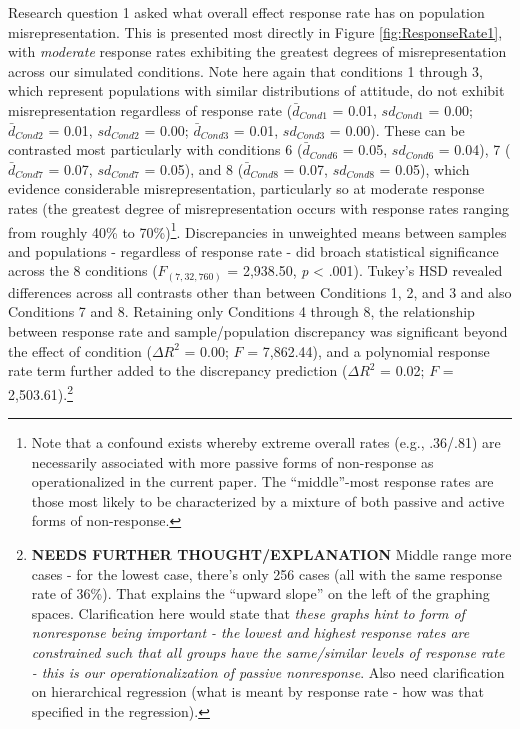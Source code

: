 \documentclass[
  man,mask]{apa7}
\begin{document}
Research question 1 asked what overall effect response rate has on population misrepresentation. This is presented most directly in Figure \ref{fig:ResponseRate1}, with \emph{moderate} response rates exhibiting the greatest degrees of misrepresentation across our simulated conditions. Note here again that conditions 1 through 3, which represent populations with similar distributions of attitude, do not exhibit misrepresentation regardless of response rate (\(\bar{d}_{Cond1}\) = 0.01, \(sd_{Cond1}\) = 0.00; \(\bar{d}_{Cond2}\) = 0.01, \(sd_{Cond2}\) = 0.00; \(\bar{d}_{Cond3}\) = 0.01, \(sd_{Cond3}\) = 0.00). These can be contrasted most particularly with conditions 6 (\(\bar{d}_{Cond6}\) = 0.05, \(sd_{Cond6}\) = 0.04), 7 (\(\bar{d}_{Cond7}\) = 0.07, \(sd_{Cond7}\) = 0.05), and 8 (\(\bar{d}_{Cond8}\) = 0.07, \(sd_{Cond8}\) = 0.05), which evidence considerable misrepresentation, particularly so at moderate response rates (the greatest degree of misrepresentation occurs with response rates ranging from roughly 40\% to 70\%)\footnote{Note that a confound exists whereby extreme overall rates (e.g., .36/.81) are necessarily associated with more passive forms of non-response as operationalized in the current paper. The ``middle''-most response rates are those most likely to be characterized by a mixture of both passive and active forms of non-response.}. Discrepancies in unweighted means between samples and populations - regardless of response rate - did broach statistical significance across the 8 conditions (\(F_{(7,32,760)}\) = 2,938.50, \emph{p} \textless{} .001). Tukey's HSD revealed differences across all contrasts other than between Conditions 1, 2, and 3 and also Conditions 7 and 8. Retaining only Conditions 4 through 8, the relationship between response rate and sample/population discrepancy was significant beyond the effect of condition (\(\Delta{R^2}\) = 0.00; \(F\) = 7,862.44), and a polynomial response rate term further added to the discrepancy prediction (\(\Delta{R^2}\) = 0.02; \(F\) = 2,503.61).\footnote{\textbf{NEEDS FURTHER THOUGHT/EXPLANATION} Middle range more cases - for the lowest case, there's only 256 cases (all with the same response rate of 36\%). That explains the ``upward slope'' on the left of the graphing spaces. Clarification here would state that \emph{these graphs hint to form of nonresponse being important - the lowest and highest response rates are constrained such that all groups have the same/similar levels of response rate - this is our operationalization of passive nonresponse}. Also need clarification on hierarchical regression (what is meant by response rate - how was that specified in the regression).}
\end{document}
